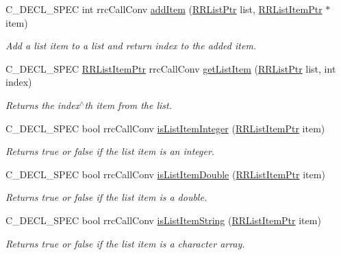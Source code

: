 \begin{DoxyCompactItemize}
C\+\_\+\+D\+E\+C\+L\+\_\+\+S\+P\+E\+C int rrc\+Call\+Conv \hyperlink{group__list_ga2ae7d5112afc94d0dae42cc89b5158ee}{add\+Item} (\hyperlink{rrc__types_8h_a32a8a60ac06858ff3a791672bd2bec73}{R\+R\+List\+Ptr} list, \hyperlink{rrc__types_8h_a79938364b69256c42480bb3a29ebf73e}{R\+R\+List\+Item\+Ptr} $\ast$item)
\begin{DoxyCompactList}\small\item\em Add a list item to a list and return index to the added item. \end{DoxyCompactList}\item 
C\+\_\+\+D\+E\+C\+L\+\_\+\+S\+P\+E\+C \hyperlink{rrc__types_8h_a79938364b69256c42480bb3a29ebf73e}{R\+R\+List\+Item\+Ptr} rrc\+Call\+Conv \hyperlink{group__list_ga11a02911ab01db4dc839ae97782e5bf1}{get\+List\+Item} (\hyperlink{rrc__types_8h_a32a8a60ac06858ff3a791672bd2bec73}{R\+R\+List\+Ptr} list, int index)
\begin{DoxyCompactList}\small\item\em Returns the index$^\wedge$th item from the list. \end{DoxyCompactList}\item 
C\+\_\+\+D\+E\+C\+L\+\_\+\+S\+P\+E\+C bool rrc\+Call\+Conv \hyperlink{group__list_ga1606c8b04450d78d4801e652b034a42a}{is\+List\+Item\+Integer} (\hyperlink{rrc__types_8h_a79938364b69256c42480bb3a29ebf73e}{R\+R\+List\+Item\+Ptr} item)
\begin{DoxyCompactList}\small\item\em Returns true or false if the list item is an integer. \end{DoxyCompactList}\item 
C\+\_\+\+D\+E\+C\+L\+\_\+\+S\+P\+E\+C bool rrc\+Call\+Conv \hyperlink{group__list_ga1ffb77315b7ffd5e711c2a8171069caa}{is\+List\+Item\+Double} (\hyperlink{rrc__types_8h_a79938364b69256c42480bb3a29ebf73e}{R\+R\+List\+Item\+Ptr} item)
\begin{DoxyCompactList}\small\item\em Returns true or false if the list item is a double. \end{DoxyCompactList}\item 
C\+\_\+\+D\+E\+C\+L\+\_\+\+S\+P\+E\+C bool rrc\+Call\+Conv \hyperlink{group__list_ga2fc0e7b031bd6952cbce509e150d8191}{is\+List\+Item\+String} (\hyperlink{rrc__types_8h_a79938364b69256c42480bb3a29ebf73e}{R\+R\+List\+Item\+Ptr} item)
\begin{DoxyCompactList}\small\item\em Returns true or false if the list item is a character array. \end{DoxyCompactList}\item 

\end{DoxyCompactItemize}
